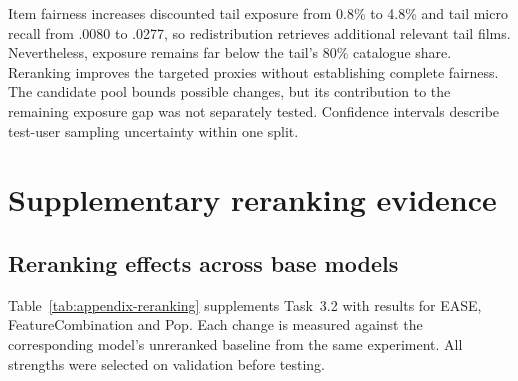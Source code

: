 \documentclass[12pt,a4paper]{article}   %
\begin{document}
Item fairness increases discounted tail exposure from
0.8\% to 4.8\% and tail micro recall from .0080 to .0277,
so redistribution retrieves additional relevant tail
films. Nevertheless, exposure remains far below the
tail's 80\% catalogue share. Reranking improves the
targeted proxies without establishing complete fairness.
The candidate pool bounds possible changes, but its
contribution to the remaining exposure gap was not
separately tested. Confidence intervals describe
test-user sampling uncertainty within one split.
\clearpage
\appendix

\renewcommand{\thetable}{\thesection.\arabic{table}}
\renewcommand{\thefigure}{\thesection.\arabic{figure}}

\section{Supplementary reranking evidence}
\label{app:task3}

\setcounter{table}{0}
\setcounter{figure}{0}

\subsection{Reranking effects across base models}

Table~\ref{tab:appendix-reranking} supplements Task~3.2
with results for EASE, FeatureCombination and Pop.
Each change is measured against the corresponding
model's unreranked baseline from the same experiment.
All strengths were selected on validation before testing.
\end{document}
